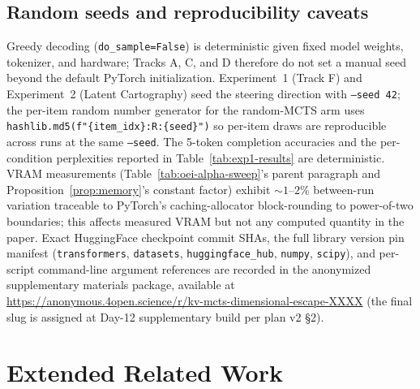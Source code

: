\subsection{Random seeds and reproducibility caveats}
Greedy decoding (\texttt{do\_sample=False}) is deterministic given fixed model weights, tokenizer, and hardware; Tracks A, C, and D therefore do not set a manual seed beyond the default PyTorch initialization. Experiment~1 (Track F) and Experiment~2 (Latent Cartography) seed the steering direction with \texttt{--seed 42}; the per-item random number generator for the random-MCTS arm uses \texttt{hashlib.md5(f"\{item\_idx\}:R:\{seed\}")} so per-item draws are reproducible across runs at the same \texttt{--seed}. The 5-token completion accuracies and the per-condition perplexities reported in Table~\ref{tab:exp1-results} are deterministic. VRAM measurements (Table~\ref{tab:oei-alpha-sweep}'s parent paragraph and Proposition~\ref{prop:memory}'s constant factor) exhibit ${\sim}1$--$2\%$ between-run variation traceable to PyTorch's caching-allocator block-rounding to power-of-two boundaries; this affects measured VRAM but not any computed quantity in the paper. Exact HuggingFace checkpoint commit SHAs, the full library version pin manifest (\texttt{transformers}, \texttt{datasets}, \texttt{huggingface\_hub}, \texttt{numpy}, \texttt{scipy}), and per-script command-line argument references are recorded in the anonymized supplementary materials package, available at \url{https://anonymous.4open.science/r/kv-mcts-dimensional-escape-XXXX} (the final slug is assigned at Day-12 supplementary build per plan v2 §2).

\section{Extended Related Work}\label{sec:appendix-related-work}

